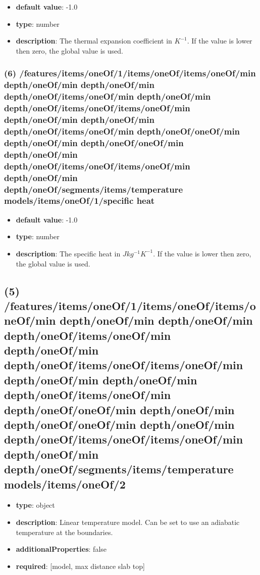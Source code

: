 \begin{itemize}[leftmargin=6em]\item {\bf default value}: -1.0
\item {\bf type}: number
\item {\bf description}: The thermal expansion coefficient in $K^{-1}$. If the value is lower then zero, the global value is used.
\end{itemize}\subsubsection{(6) /features/items/oneOf/1/items/oneOf/items/oneOf/min depth/oneOf/min depth/oneOf/min depth/oneOf/items/oneOf/min depth/oneOf/min depth/oneOf/items/oneOf/items/oneOf/min depth/oneOf/min depth/oneOf/min depth/oneOf/items/oneOf/min depth/oneOf/oneOf/min depth/oneOf/min depth/oneOf/oneOf/min depth/oneOf/min depth/oneOf/items/oneOf/items/oneOf/min depth/oneOf/min depth/oneOf/segments/items/temperature models/items/oneOf/1/specific heat}
\begin{itemize}[leftmargin=6em]\item {\bf default value}: -1.0
\item {\bf type}: number
\item {\bf description}: The specific heat in $J kg^{-1} K^{-1}$. If the value is lower then zero, the global value is used.
\end{itemize}\subsection{(5) /features/items/oneOf/1/items/oneOf/items/oneOf/min depth/oneOf/min depth/oneOf/min depth/oneOf/items/oneOf/min depth/oneOf/min depth/oneOf/items/oneOf/items/oneOf/min depth/oneOf/min depth/oneOf/min depth/oneOf/items/oneOf/min depth/oneOf/oneOf/min depth/oneOf/min depth/oneOf/oneOf/min depth/oneOf/min depth/oneOf/items/oneOf/items/oneOf/min depth/oneOf/min depth/oneOf/segments/items/temperature models/items/oneOf/2}
\begin{itemize}[leftmargin=5em]\item {\bf type}: object
\item {\bf description}: Linear temperature model. Can be set to use an adiabatic temperature at the boundaries.
\item {\bf additionalProperties}: false
\item {\bf required}: [model, max distance slab top]\end{itemize}
